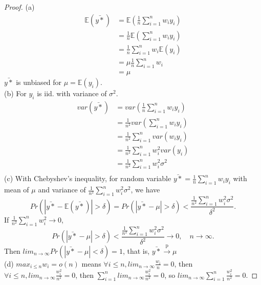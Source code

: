 \documentclass[12pt]{article}
\begin{document}
\begin{proof}
(a) \begin{align*}
\mathbb{E}(\bar{y*}) &= \mathbb{E}(\frac{1}{n}\sum_{i = 1}^{n}w_i y_i)\\
&=\frac{1}{n}\mathbb{E}(\sum_{i = 1}^{n}w_i y_i)\\
&=\frac{1}{n}\sum_{i = 1}^{n}w_i\mathbb{E}(y_i)\\
&=\mu \frac{1}{n}\sum_{i = 1}^{n}w_i\\
&=\mu
\end{align*}
$\bar{y*}$ is unbiased for $\mu = \mathbb{E}(y_i)$.\\
(b) For $y_i$ is iid. with variance of $\sigma^2$.
\begin{align*}
var(\bar{y*})& = var(\frac{1}{n}\sum_{i = 1}^n w_i y_i)\\
&= \frac{1}{n^2}var(\sum_{i = 1}^n w_i y_i)\\
&= \frac{1}{n^2}\sum_{i = 1}^n var(w_i y_i)\\
&=\frac{1}{n^2}\sum_{i = 1}^n w_i^2 var(y_i)\\
& = \frac{1}{n^2}\sum_{i = 1}^n w_i^2 \sigma^2\\
\end{align*}
(c)
 With Chebyshev's inequality, for random variable $\bar{y*} = \frac{1}{n}\sum_{i = 1}^{n}w_i y_i$ with mean of $\mu$ and variance of $\frac{1}{n^2}\sum_{i = 1}^n w_i^2 \sigma^2$, we have 
 $$Pr(|\bar{y*} - \mathbb{E}(\bar{y*})|>\delta) = Pr(|\bar{y*} - \mu|>\delta) <\frac{\frac{1}{n^2}\sum_{i = 1}^n w_i^2 \sigma^2}{\delta^2} .$$
If $\frac{1}{n^2}\sum_{i = 1}^{n}w_i^2\to 0$,
$$Pr(|\bar{y*} - \mu|>\delta) <\frac{\frac{1}{n^2}\sum_{i = 1}^n w_i^2 \sigma^2}{\delta^2} \to 0,\quad n\to \infty.$$
Then $lim_{n\to \infty}Pr(|\bar{y*}-\mu|<\delta) = 1$, that is, $\bar{y*}\xrightarrow{\text{p}}\mu$\\
(d) $max_{i\le n}w_i = o(n)$ means $\forall i \le n, lim_{n\to \infty} \frac{w_i}{n} = 0$, then $\forall i \le n, lim_{n\to \infty} \frac{w_i^2}{n^2} = 0$, then $\sum_{i = 1}^{n} lim_{n\to \infty} \frac{w_i^2}{n^2} = 0$, so $lim_{n\to \infty}\sum_{i = 1}^{n}  \frac{w_i^2}{n^2} = 0.$
\end{proof}
\end{document}
